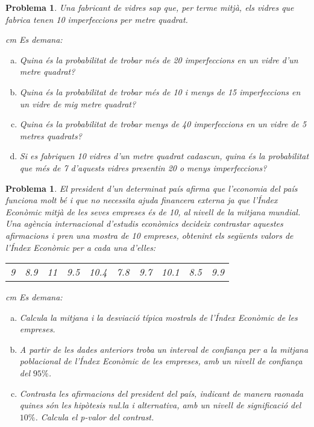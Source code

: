 \documentclass[a4paper,12pt]{article}
\newcounter{prbcont}
\newtheorem{problema}[prbcont]{Problema}
\begin{document}
\vskip 0.5cm
\begin{problema}
Una fabricant de vidres sap que, per terme mitjà, els vidres que fabrica tenen 10 imperfeccions per metre quadrat.

 cm
Es demana:

\begin{enumerate}[a)]
\item Quina és la probabilitat de trobar més de 20 imperfeccions en un vidre d'un metre quadrat?
\item Quina és la probabilitat de trobar més de 10 i menys de 15 imperfeccions en un vidre de mig metre quadrat?
\item Quina és la probabilitat de trobar menys de 40 imperfeccions en un vidre de 5 metres quadrats?
\item Si es fabriquen 10 vidres d'un metre quadrat cadascun, quina és la probabilitat que més de 7 d'aquests 
vidres presentin 20 o menys imperfeccions?
\end{enumerate}
\end{problema}


\vskip 0.5cm
\begin{problema}
El president d'un determinat país afirma que l'economia del país funciona molt bé i que no necessita ajuda
financera externa ja que l'Índex Econòmic mitjà de les seves empreses és de 10, al nivell de la mitjana mundial. 
Una agència internacional d'estudis econòmics decideix contrastar aquestes afirmacions i pren una mostra de
10 empreses, obtenint els següents valors de l'Índex Econòmic per a cada una d'elles:

\begin{center}
\begin{tabular}{cccccccccc}
9 & 8.9 & 11 & 9.5 & 10.4 & 7.8 & 9.7 & 10.1 & 8.5 & 9.9 
\end{tabular}
\end{center}

 cm
Es demana:

\begin{enumerate}[a)]
\item Calcula la mitjana i la desviació típica mostrals de l'Índex Econòmic de les empreses.
\item A partir de les dades anteriors troba un interval de confiança per a la mitjana poblacional de l'Índex Econòmic de les empreses,
amb un nivell de confiança del $95\%$.
\item Contrasta les afirmacions del president del país, indicant de manera raonada quines són les hipòtesis nul.la i alternativa,
amb un nivell de significació del $10\%$. Calcula el p-valor del contrast.
\end{enumerate}
\end{problema}
\end{document}
